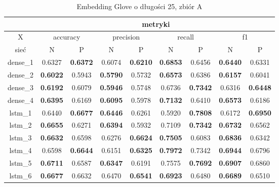   \begin{table}[h] \centering
    \caption{Embedding Glove o długości 25, zbiór A}
    \label{tab:wyniki_glove_A}
    \begin{tabular} {|c|c|c|c|c|c|c|c|c| }    \hline
    & \multicolumn{8}{c|}{metryki}                                                                                                                               \\ \hline
    X        & \multicolumn{2}{c|}{accuracy} & \multicolumn{2}{c|}{precision} & \multicolumn{2}{c|}{recall} & \multicolumn{2}{c|}{f1}                                     \\ \hline
    sieć     & N                             & P                              & N                           & P                       & N      & P      & N      & P      \\ \hline
    dense\_1  & 0.6327 & \textbf{0.6372} & 0.6074 & \textbf{0.6210} & \textbf{0.6853} & 0.6456 & \textbf{0.6440} & 0.6331 \\ \hline
    dense\_2  & \textbf{0.6022} & 0.5943 & \textbf{0.5790} & 0.5732 & \textbf{0.6573} & 0.6386 & \textbf{0.6157} & 0.6041 \\ \hline
    dense\_3  & \textbf{0.6192} & 0.6079 & \textbf{0.5946} & 0.5748 & 0.6736 & \textbf{0.7342} & 0.6316 & \textbf{0.6448} \\ \hline
    dense\_4  & \textbf{0.6395} & 0.6169 & \textbf{0.6095} & 0.5978 & \textbf{0.7132} & 0.6410 & \textbf{0.6573} & 0.6186 \\ \hline
    lstm\_1   & 0.6440 & \textbf{0.6677} & \textbf{0.6446} & 0.6261 & 0.5920 & \textbf{0.7808} & 0.6172 & \textbf{\cellcolor{green!50}0.6950} \\ \hline
    lstm\_2   & \textbf{0.6655} & 0.6271 & \textbf{0.6394} & 0.5932 & 0.7109 & \textbf{0.7342} & \textbf{0.6732} & 0.6562 \\ \hline
    lstm\_3   & \textbf{0.6632} & 0.6598 & 0.6276 & \textbf{0.6624} & \textbf{0.7505} & 0.6083 & \textbf{0.6836} & 0.6342 \\ \hline
    lstm\_4   & 0.6598 & \textbf{0.6644} & 0.6151 & \textbf{0.6325} & \textbf{0.7972} & 0.7342 & \textbf{\cellcolor{green!50}0.6944} & 0.6796 \\ \hline
    lstm\_5   & \textbf{\cellcolor{green!50}0.6711} & 0.6587 & \textbf{0.6347} & 0.6191 & 0.7575 & \textbf{0.7692} & \textbf{0.6907} & 0.6860 \\ \hline
    lstm\_6   & \textbf{0.6677} & 0.6632 & 0.6470 & \textbf{0.6541} & \textbf{0.6923} & 0.6480 & \textbf{0.6689} & 0.6510 \\ \hline

\end{tabular}
\end{table}
